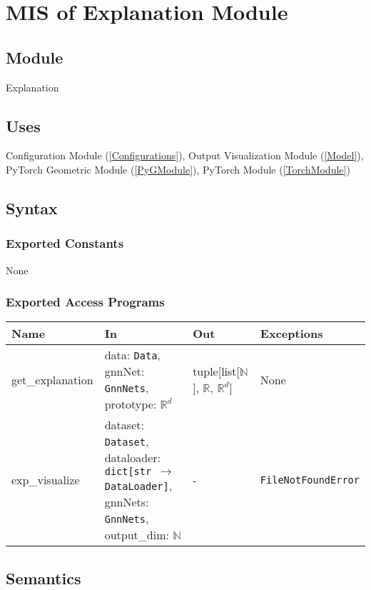 \documentclass[12pt, titlepage]{article}
\begin{document}
\newpage




\section{MIS of Explanation Module} \label{Explanation}

\subsection{Module}
Explanation

\subsection{Uses}
Configuration Module (\ref{Configurations}), Output Visualization Module (\ref{Model}), PyTorch Geometric Module (\ref{PyGModule}), PyTorch Module (\ref{TorchModule})

\subsection{Syntax}

\subsubsection{Exported Constants}
None

\subsubsection{Exported Access Programs}

\begin{center}
\begin{tabular}{p{3cm} p{5cm} p{5cm} p{2.5cm}}
\hline
\textbf{Name} & \textbf{In} & \textbf{Out} & \textbf{Exceptions} \\
\hline
get\_explanation & data: \texttt{Data}, gnnNet: \texttt{GnnNets}, prototype: \(\mathbb{R}^d\) & tuple[list[\(\mathbb{N}\)], \(\mathbb{R}\), \(\mathbb{R}^{d}\)] & None \\
exp\_visualize & dataset: \texttt{Dataset}, dataloader: \texttt{dict[str \(\rightarrow\) DataLoader]}, gnnNets: \texttt{GnnNets}, output\_dim: \(\mathbb{N}\) & - & \texttt{FileNotFoundError} \\
\hline
\end{tabular}
\end{center}

\subsection{Semantics}
\end{document}

